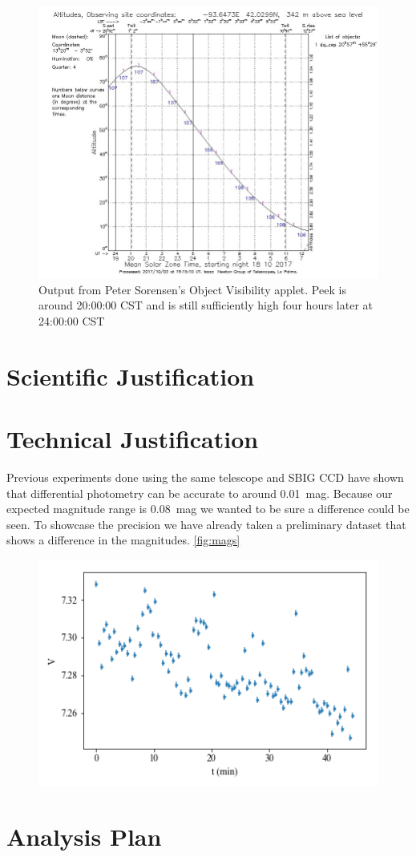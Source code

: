 \documentclass[]{article}
\begin{document}
	
	\begin{figure}[p]
		\includegraphics[width=\linewidth]{figs/staralt.png}
		\caption{Output from Peter Sorensen's Object Visibility applet. Peek is around 20:00:00 CST and is still sufficiently high four hours later at 24:00:00 CST}
		\label{fig:staralt}
	\end{figure}

\section{Scientific Justification}

\section{Technical Justification}

	Previous experiments done using the same telescope and SBIG CCD have shown that differential photometry can be accurate to around \SI{0.01}{mag}. Because our expected magnitude range is \SI{0.08}{mag} we wanted to be sure a difference could be seen. To showcase the precision we have already taken a preliminary dataset that shows a difference in the magnitudes. \autoref{fig:mags}

	\begin{figure}[p]
		\includegraphics[width=\linewidth]{figs/mags.png}
		\caption{}
		\label{fig:mags}
	\end{figure}

\section{Analysis Plan}



%
%
\end{document}
